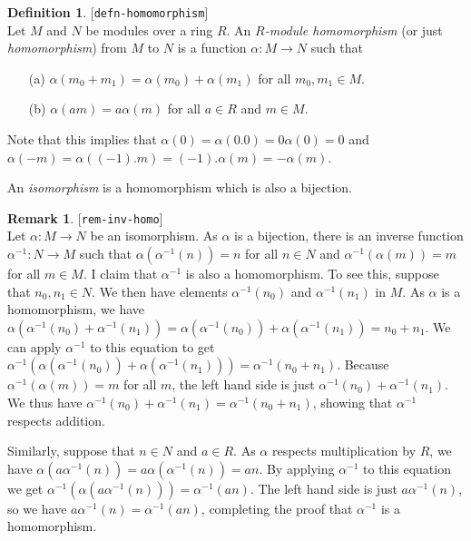 \documentclass{amsart}
\newcommand{\lbl}[1]{\label{#1}\textup{[\texttt{#1}]}\ \\}
\newcommand{\lbl}{\label}
\newcommand{\al}        {\alpha}
\newcommand{\xra}       {\xrightarrow}
\renewcommand{\:}{\colon}
\theoremstyle{definition}
\newtheorem{remark}[theorem]{Remark}
\newtheorem{definition}[theorem]{Definition}
\begin{document}
\begin{definition}\lbl{defn-homomorphism}
 Let $M$ and $N$ be modules over a ring $R$.  An \emph{$R$-module
 homomorphism} (or just \emph{homomorphism}) from $M$ to $N$ is a
 function $\al\:M\xra{}N$ such that
 \begin{itemize}
 \item[(a)] $\al(m_0+m_1)=\al(m_0)+\al(m_1)$ for all $m_0,m_1\in M$.
 \item[(b)] $\al(am)=a\al(m)$ for all $a\in R$ and $m\in M$.
 \end{itemize}
 Note that this implies that $\al(0)=\al(0.0)=0\al(0)=0$ and
 $\al(-m)=\al((-1).m)=(-1).\al(m)=-\al(m)$.

 An \emph{isomorphism} is a homomorphism which is also a bijection.  
\end{definition}
\begin{remark}\lbl{rem-inv-homo}
 Let $\al\:M\xra{}N$ be an isomorphism.  As $\al$ is a bijection,
 there is an inverse function $\al^{-1}\:N\xra{}M$ such that
 $\al(\al^{-1}(n))=n$ for all $n\in N$ and $\al^{-1}(\al(m))=m$ for
 all $m\in M$.  I claim that $\al^{-1}$ is also a homomorphism.  To
 see this, suppose that $n_0,n_1\in N$.  We then have elements
 $\al^{-1}(n_0)$ and $\al^{-1}(n_1)$ in $M$.  As $\al$ is a
 homomorphism, we have $\al(\al^{-1}(n_0)+\al^{-1}(n_1))=
 \al(\al^{-1}(n_0))+\al(\al^{-1}(n_1))=n_0+n_1$.  We can apply
 $\al^{-1}$ to this equation to get
 $\al^{-1}(\al(\al^{-1}(n_0))+\al(\al^{-1}(n_1)))=\al^{-1}(n_0+n_1)$.
 Because $\al^{-1}(\al(m))=m$ for all $m$, the left hand side is just
 $\al^{-1}(n_0)+\al^{-1}(n_1)$.  We thus have
 $\al^{-1}(n_0)+\al^{-1}(n_1)=\al^{-1}(n_0+n_1)$, showing that
 $\al^{-1}$ respects addition.

 Similarly, suppose that $n\in N$ and $a\in R$.  As $\al$ respects
 multiplication by $R$, we have
 $\al(a\al^{-1}(n))=a\al(\al^{-1}(n))=an$.  By applying $\al^{-1}$ to
 this equation we get $\al^{-1}(\al(a\al^{-1}(n)))=\al^{-1}(an)$.  The
 left hand side is just $a\al^{-1}(n)$, so we have
 $a\al^{-1}(n)=\al^{-1}(an)$, completing the proof that $\al^{-1}$ is
 a homomorphism.
\end{remark}
\end{document}
